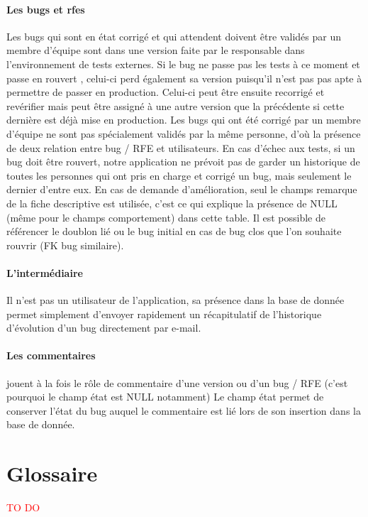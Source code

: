 \documentclass{article}[12pt]
\begin{document}
\paragraph{Les bugs et rfes}
Les bugs qui sont en état \og corrigé \fg et qui attendent doivent être validés par un membre d'équipe sont dans une version faite par le responsable dans l'environnement de tests externes. Si le bug ne passe pas les tests à ce moment et passe en \og rouvert \fg{}, celui-ci perd également sa version puisqu'il n'est pas pas apte à permettre de passer en production. Celui-ci peut être ensuite recorrigé et revérifier mais peut être assigné à une autre version que la précédente si cette dernière est déjà mise en production.
\newline
\newline
Les bugs qui ont été corrigé par un membre d'équipe ne sont pas spécialement validés par la même personne, d'où la présence de deux relation entre bug / RFE et utilisateurs. En cas d'échec aux tests, si un bug doit être rouvert, notre application ne prévoit pas de garder un historique de toutes les personnes qui ont pris en charge et corrigé un bug, mais seulement le dernier d'entre eux. 
\newline
\newline
En cas de demande d'amélioration, seul le champs \og remarque \fg de la fiche descriptive est utilisée, c'est ce qui explique la présence de NULL (même pour le champs comportement) dans cette table.
\newline
\newline
Il est possible de référencer le doublon lié ou le bug initial en cas de bug clos que l'on souhaite rouvrir (FK bug similaire).

\paragraph{L'intermédiaire}
Il n'est pas un utilisateur de l'application, sa présence dans la base de donnée permet simplement d'envoyer rapidement un récapitulatif de l'historique d'évolution d'un bug directement par e-mail.

\paragraph{Les commentaires} jouent à la fois le rôle de commentaire d'une version ou d'un bug / RFE (c'est pourquoi le champ état est NULL notamment) Le champ \og état \fg permet de conserver l'état du bug auquel le commentaire est lié lors de son insertion dans la base de donnée.
\section{Glossaire}


 \textcolor{red}{TO DO}
\end{document}

